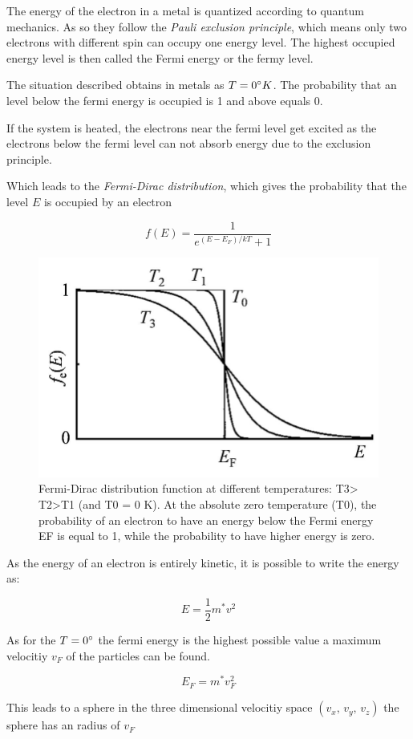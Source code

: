 The energy of the electron in a metal is quantized according to quantum mechanics.
As so they follow the \textit{Pauli exclusion principle}, which means only two 
electrons with different spin can occupy one energy level.
The highest occupied energy level is then called the Fermi energy or the fermy
level.

The situation described obtains in metals as $T=0 \degree K$. The probability that 
an level below the fermi energy is occupied is 1 and above equals 0.

If the system is heated, the electrons near the fermi level get excited as 
the electrons below the fermi level can not absorb energy due to the exclusion
principle.

Which leads to the \textit{Fermi-Dirac distribution}, which gives
the probability that the level $E$ is occupied by an electron

\begin{equation}
    f(E) = \frac{1}{e^{(E-E_F)/kT}+1}
\end{equation}

\begin{figure}[H]
    \centering
    \includegraphics[width=0.5\linewidth]{Graphics/Chapter1/Fermi-Dirac-distribution.png}
    \caption{Fermi-Dirac distribution function at different temperatures: T3> T2>T1
     (and T0 = 0 K). At the absolute zero temperature (T0), the probability of an 
     electron to have an energy below the Fermi energy EF is equal to 1, while the 
     probability to have higher energy is zero. \cite{fermi_dist}}
    \label{}
\end{figure}

As the energy of an electron is entirely kinetic, it is possible
to write the energy as:

$$E = \frac{1}{2} m^* v^2$$

As for the $T=0 \degree$ the fermi energy is the highest possible value
a maximum velocitiy $v_F$ of the particles can be found. 

$$E_F = m^*v_F^2$$

This leads to a sphere in the three dimensional velocitiy space
$(v_x, \, v_y, \, v_z)$ the sphere has an radius of $v_F$


